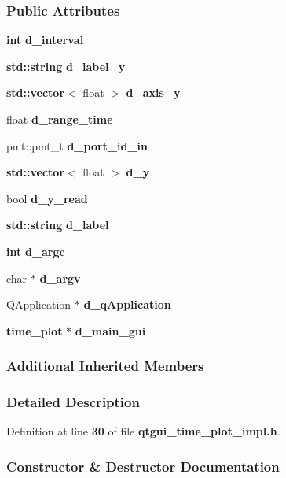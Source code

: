 \subsubsection*{Public Attributes}
\begin{DoxyCompactItemize}
\item 
{\bf int} {\bf d\+\_\+interval}
\item 
{\bf std\+::string} {\bf d\+\_\+label\+\_\+y}
\item 
{\bf std\+::vector}$<$ float $>$ {\bf d\+\_\+axis\+\_\+y}
\item 
float {\bf d\+\_\+range\+\_\+time}
\item 
pmt\+::pmt\+\_\+t {\bf d\+\_\+port\+\_\+id\+\_\+in}
\item 
{\bf std\+::vector}$<$ float $>$ {\bf d\+\_\+y}
\item 
bool {\bf d\+\_\+y\+\_\+read}
\item 
{\bf std\+::string} {\bf d\+\_\+label}
\item 
{\bf int} {\bf d\+\_\+argc}
\item 
char $\ast$ {\bf d\+\_\+argv}
\item 
Q\+Application $\ast$ {\bf d\+\_\+q\+Application}
\item 
{\bf time\+\_\+plot} $\ast$ {\bf d\+\_\+main\+\_\+gui}
\end{DoxyCompactItemize}
\subsubsection*{Additional Inherited Members}


\subsubsection{Detailed Description}


Definition at line {\bf 30} of file {\bf qtgui\+\_\+time\+\_\+plot\+\_\+impl.\+h}.



\subsubsection{Constructor \& Destructor Documentation}
